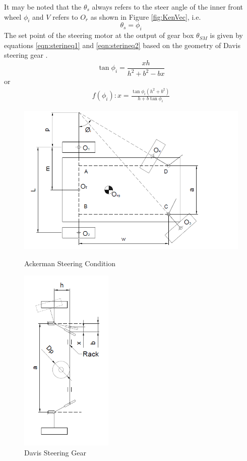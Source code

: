  It may be noted that the $\theta_s$ always refers to the steer angle of the inner front wheel $\phi_i$  and $V$ refers to $O_r$ as shown in Figure \ref{fig:KenVec}, i.e.
 \begin{equation}
	 \theta_s =\phi_i
 \end{equation}
 The set point of the steering motor at the output of  gear box $\theta_{SM}$ is given by equations \ref{eqn:sterineq1} and \ref{eqn:sterineq2}  based on the geometry of Davis steering gear \cite{TOMBook}.
\begin{equation*}
 \tan\phi_i=\frac{xh}{h^2+b^2-bx}
\end{equation*}
or
\begin{eqnarray}
f(\phi_i): x=\frac{\tan\phi_i (h^2+b^2)}{h+b \tan\phi_i }
\label{eqn:sterineq1}
\end{eqnarray}
\begin{figure}
	\begin{minipage}[t]{0.6\textwidth}
		\centering
		\includegraphics[width=5in]{Chapter5/fig/kinvec} 
		\caption{Ackerman Steering Condition}\label{fig:KenVec}
	\end{minipage}
	\begin{minipage}[t]{0.7\textwidth}
		\centering
		\includegraphics[height=3.5in]{Chapter5/fig/davisgear} 
		\caption{Davis Steering Gear}\label{fig:steering_gear_train}
	\end{minipage}
\end{figure}
